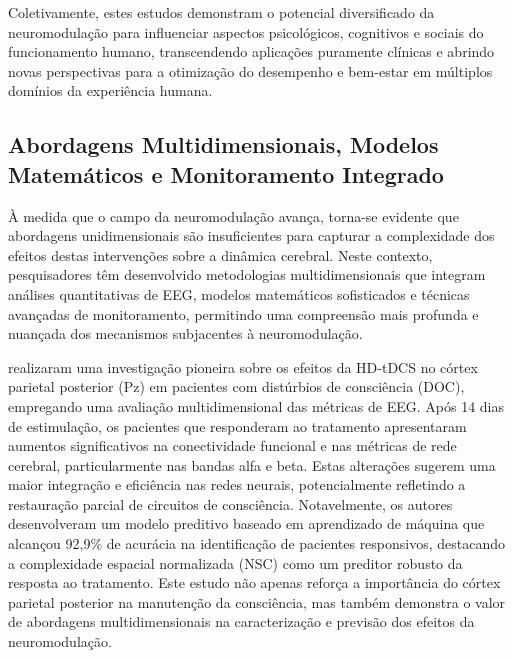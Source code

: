 Coletivamente, estes estudos demonstram o potencial diversificado da neuromodulação para influenciar aspectos psicológicos, cognitivos e sociais do funcionamento humano, transcendendo aplicações puramente clínicas e abrindo novas perspectivas para a otimização do desempenho e bem-estar em múltiplos domínios da experiência humana.

\subsection{Abordagens Multidimensionais, Modelos Matemáticos e Monitoramento Integrado}
À medida que o campo da neuromodulação avança, torna-se evidente que abordagens unidimensionais são insuficientes para capturar a complexidade dos efeitos destas intervenções sobre a dinâmica cerebral. Neste contexto, pesquisadores têm desenvolvido metodologias multidimensionais que integram análises quantitativas de EEG, modelos matemáticos sofisticados e técnicas avançadas de monitoramento, permitindo uma compreensão mais profunda e nuançada dos mecanismos subjacentes à neuromodulação.

 realizaram uma investigação pioneira sobre os efeitos da HD-tDCS no córtex parietal posterior (Pz) em pacientes com distúrbios de consciência (DOC), empregando uma avaliação multidimensional das métricas de EEG. Após 14 dias de estimulação, os pacientes que responderam ao tratamento apresentaram aumentos significativos na conectividade funcional e nas métricas de rede cerebral, particularmente nas bandas alfa e beta. Estas alterações sugerem uma maior integração e eficiência nas redes neurais, potencialmente refletindo a restauração parcial de circuitos de consciência. Notavelmente, os autores desenvolveram um modelo preditivo baseado em aprendizado de máquina que alcançou 92,9\% de acurácia na identificação de pacientes responsivos, destacando a complexidade espacial normalizada (NSC) como um preditor robusto da resposta ao tratamento. Este estudo não apenas reforça a importância do córtex parietal posterior na manutenção da consciência, mas também demonstra o valor de abordagens multidimensionais na caracterização e previsão dos efeitos da neuromodulação.

